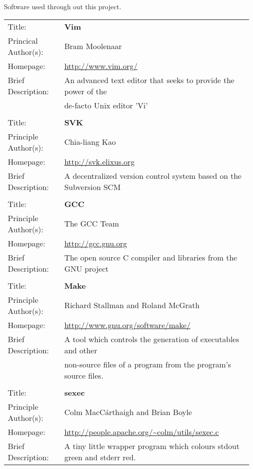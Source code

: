 \documentclass[a4paper,12pt]{article}
\begin{document}
Software used through out this project. 

\begin{tabular}{ll}
Title: &	\textbf{Vim}	\\
Princical Author(s): &	Bram Moolenaar	\\
Homepage: &	\url{http://www.vim.org/}	\\	
Brief Description: 	&	An advanced text editor that seeks to provide the power of the \\ 
	&	de-facto Unix editor 'Vi'	\\
		&	\\
Title:	&	\textbf{SVK}	\\
Principle Author(s): &	Chia-liang Kao	\\
Homepage:	&	\url{http://svk.elixus.org}	\\
Brief Description:	&	A decentralized version control system based on the Subversion SCM \\
		&	\\
Title:	&	\textbf{GCC}	\\	
Principle Author(s): &	The GCC Team	\\
Homepage:	&	\url{http://gcc.gnu.org}	\\
Brief Description:	&	The open source C compiler and libraries from the GNU project \\
		&	\\
Title:	&	\textbf{Make}	\\
Principle Author(s): &	Richard Stallman and Roland McGrath	\\
Homepage:	&	\url{http://www.gnu.org/software/make/} \\
Brief Description:	&	A tool which controls the generation of executables and other \\
	&	non-source files of a program from the program's source files. \\
	&		\\
Title: 	&	\textbf{sexec}	\\
Principle Author(s): &	Colm MacC\'{a}rthaigh and Brian Boyle	\\
Homepage:	&	\url{http://people.apache.org/~colm/utils/sexec.c} \\
Brief Description:	&	A tiny little wrapper program which colours stdout green and stderr red.\\ 
\end{tabular}
\end{document}
